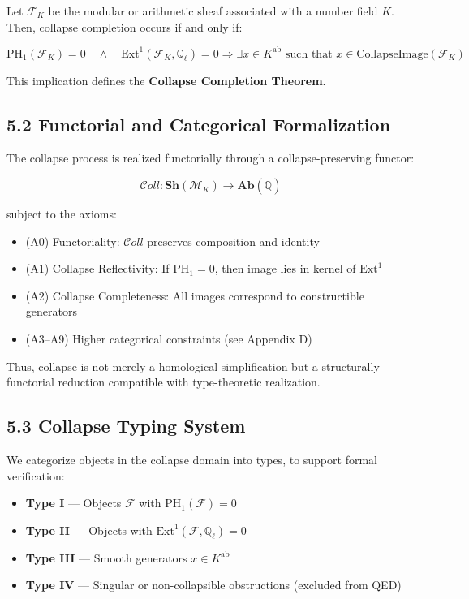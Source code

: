 \documentclass[11pt]{article}
\begin{document}
Let \( \mathcal{F}_K \) be the modular or arithmetic sheaf associated with a number field \( K \). Then, collapse completion occurs if and only if:

\[
\boxed{
\mathrm{PH}_1(\mathcal{F}_K) = 0 \quad \wedge \quad \mathrm{Ext}^1(\mathcal{F}_K, \mathbb{Q}_\ell) = 0
}
\Rightarrow \exists x \in K^{\mathrm{ab}} \text{ such that } x \in \text{CollapseImage}(\mathcal{F}_K)
\]

This implication defines the \textbf{Collapse Completion Theorem}.

\subsection{5.2 Functorial and Categorical Formalization}

The collapse process is realized functorially through a collapse-preserving functor:

\[
\mathcal{C}oll : \mathbf{Sh}(\mathcal{M}_K) \to \mathbf{Ab}(\overline{\mathbb{Q}})
\]

subject to the axioms:
\begin{itemize}
    \item (A0) Functoriality: \(\mathcal{C}oll\) preserves composition and identity
    \item (A1) Collapse Reflectivity: If \( \mathrm{PH}_1 = 0 \), then image lies in kernel of \(\mathrm{Ext}^1\)
    \item (A2) Collapse Completeness: All images correspond to constructible generators
    \item (A3–A9) Higher categorical constraints (see Appendix D)
\end{itemize}

Thus, collapse is not merely a homological simplification but a structurally functorial reduction compatible with type-theoretic realization.

\subsection{5.3 Collapse Typing System}

We categorize objects in the collapse domain into types, to support formal verification:

\begin{itemize}
    \item \textbf{Type I} — Objects \( \mathcal{F} \) with \( \mathrm{PH}_1(\mathcal{F}) = 0 \)
    \item \textbf{Type II} — Objects with \( \mathrm{Ext}^1(\mathcal{F}, \mathbb{Q}_\ell) = 0 \)
    \item \textbf{Type III} — Smooth generators \( x \in K^{\mathrm{ab}} \)
    \item \textbf{Type IV} — Singular or non-collapsible obstructions (excluded from QED)
\end{itemize}
\end{document}
